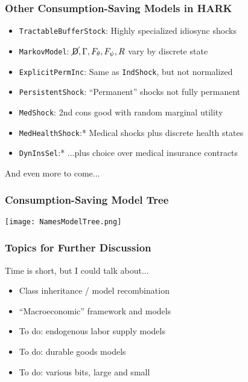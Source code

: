 \documentclass[public]{beamer}\beamerdefaultoverlayspecification{<+->}
\begin{document}
\begin{frame}
  \frametitle{Other Consumption-Saving Models in HARK}
  \begin{itemize}
  \item <1->\texttt{TractableBufferStock}: Highly specialized idiosync shocks

  \item <2->\texttt{MarkovModel}: $\cancel{\mathsf{D}},\Gamma,F_\theta,F_\psi,R$ vary by discrete state

  \item <3->\texttt{ExplicitPermInc}: Same as \texttt{IndShock}, but not normalized

  \item <3->\texttt{PersistentShock}: ``Permanent'' shocks not fully permanent

  \item <4->\texttt{MedShock}: 2nd cons good with random marginal utility

  \item <5->\texttt{MedHealthShock}:* Medical shocks plus discrete health states

  \item <5->\texttt{DynInsSel}:* ...plus choice over medical insurance contracts
  \end{itemize}
  And even more to come...
\end{frame}


\begin{frame}
  \frametitle{Consumption-Saving Model Tree}
  \begin{center}
    \texttt{[image: NamesModelTree.png]}
  \end{center}
\end{frame}


\begin{frame}\label{DiscussionTopics}
  \frametitle{Topics for Further Discussion}

  Time is short, but I could talk about...
  \begin{itemize}
  \item Class inheritance / model recombination \hyperlink{Recombination}{}

  \item ``Macroeconomic'' framework and models \hyperlink{Macroeconomics}{}

  \item To do: endogenous labor supply models  \hyperlink{LaborSupply}{}

  \item To do: durable goods models \hyperlink{DurableGoods}{}

  \item To do: various bits, large and small \hyperlink{StructuralChanges}{}
  \end{itemize}
\end{frame}
\end{document}
